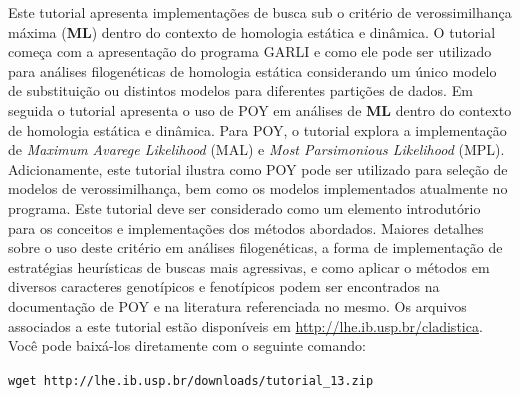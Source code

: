 Este tutorial apresenta implementações de busca sub o critério de verossimilhança máxima (\textbf{ML}) dentro do contexto de homologia estática e dinâmica. O tutorial começa com a apresentação do programa GARLI e como ele pode ser utilizado para análises filogenéticas de homologia estática considerando um único modelo de substituição ou distintos modelos para diferentes partições de dados. Em seguida o tutorial apresenta o uso de POY em análises de \textbf{ML} dentro do contexto de homologia estática e dinâmica. Para POY, o tutorial explora a implementação de \textit{Maximum Avarege Likelihood} (MAL) e \textit{Most Parsimonious Likelihood} (MPL). Adicionamente, este tutorial ilustra como POY pode ser utilizado para seleção de modelos de verossimilhança, bem como os modelos implementados atualmente no programa. Este tutorial deve ser considerado como um elemento introdutório para os conceitos e implementações dos métodos abordados. Maiores detalhes sobre o uso deste critério em análises filogenéticas, a forma de implementação de estratégias heurísticas de buscas mais agressivas, e como aplicar o métodos em diversos caracteres genotípicos e fenotípicos podem ser encontrados na documentação de POY e na literatura referenciada no mesmo. Os arquivos associados a este tutorial estão disponíveis em \url{http://lhe.ib.usp.br/cladistica}. Você pode baixá-los diretamente com o seguinte comando:

\begin{center}
\small \texttt{wget http://lhe.ib.usp.br/downloads/tutorial\_13.zip}\\
\end{center}

